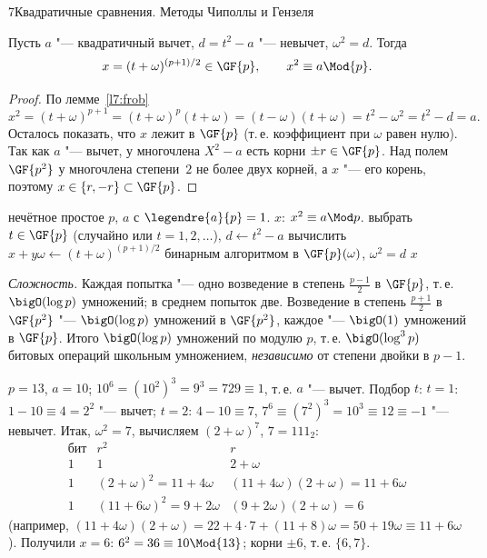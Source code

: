 \begin{lecture}{7}{Квадратичные сравнения. Методы Чиполлы и Гензеля}
\begin{theorem}[Чиполла]\label{l7:cipolla}
Пусть $a$ "--- квадратичный вычет, $d = t^2 - a$ "--- невычет, $\omega^2 = d$. Тогда
\[
  x = (t + \omega)^{(p+1)/2} \in \GF{p}, \qquad x^2 \equiv a \Mod{p}.
\]
\end{theorem}

\begin{proof}
По лемме~\ref{l7:frob}
\[
  x^2 = (t + \omega)^{p+1} = (t + \omega)^p (t + \omega) = (t - \omega)(t + \omega) = t^2 - \omega^2
  = t^2 - d = a.
\]
Осталось показать, что $x$ лежит в $\GF{p}$ (т.\,е. коэффициент при $\omega$ равен нулю). Так как
$a$ "--- вычет, у многочлена $X^2 - a$ есть корни $\pm r \in \GF{p}$. Над полем $\GF{p^2}$ у
многочлена степени~$2$ не более двух корней, а $x$ "--- его корень, поэтому $x \in \{r, -r\}
\subset \GF{p}$.
\end{proof}

\begin{algorithm}[Чиполла]
\begin{algorithmic}[1]
\Require нечётное простое $p$, $a$ с $\legendre{a}{p} = 1$.
\Ensure $x$: $x^2 \equiv a \Mod p$.
\Repeat
  \State выбрать $t \in \GF{p}$ (случайно или $t = 1, 2, \dots$), $d \gets t^2 - a$
 
\State вычислить $x + y\omega \gets (t + \omega)^{(p+1)/2}$ бинарным алгоритмом в $\GF{p}(\omega)$,
  $\omega^2 = d$
\State \Return $x$ 
\end{algorithmic}
\end{algorithm}

\emph{Сложность.} Каждая попытка "--- одно возведение в степень $\frac{p-1}{2}$ в $\GF{p}$, т.\,е.
$\bigO(\log p)$ умножений; в среднем попыток две. Возведение в степень $\frac{p+1}{2}$ в
$\GF{p^2}$ "--- $\bigO(\log p)$ умножений в $\GF{p^2}$, каждое "--- $\bigO(1)$ умножений в $\GF{p}$.
Итого $\bigO(\log p)$ умножений по модулю $p$, т.\,е. $\bigO(\log^3 p)$ битовых операций
школьным умножением, \emph{независимо} от степени двойки в $p - 1$.

\begin{example}\label{l7:ex-cipolla}
$p = 13$, $a = 10$; $10^6 = (10^2)^3 = 9^3 = 729 \equiv 1$, т.\,е. $a$ "--- вычет. Подбор $t$:
$t = 1$: $1 - 10 \equiv 4 = 2^2$ "--- вычет; $t = 2$: $4 - 10 \equiv 7$, $7^6 \equiv
(7^2)^3 = 10^3 \equiv 12 \equiv -1$ "--- невычет. Итак, $\omega^2 = 7$, вычисляем
$(2 + \omega)^7$, $7 = 111_2$:
\[
  \begin{array}{c|c|c}
    \text{бит} & r^2 & r \\ \hline
    1 & 1 & 2 + \omega \\
    1 & (2 + \omega)^2 = 11 + 4\omega & (11 + 4\omega)(2 + \omega) = 11 + 6\omega \\
    1 & (11 + 6\omega)^2 = 9 + 2\omega & (9 + 2\omega)(2 + \omega) = 6
  \end{array}
\]
(например, $(11 + 4\omega)(2 + \omega) = 22 + 4 \cdot 7 + (11 + 8)\omega = 50 + 19\omega \equiv
11 + 6\omega$). Получили $x = 6$: $6^2 = 36 \equiv 10 \Mod{13}$; корни $\pm 6$, т.\,е.
$\{6, 7\}$.
\end{example}


\end{lecture}
